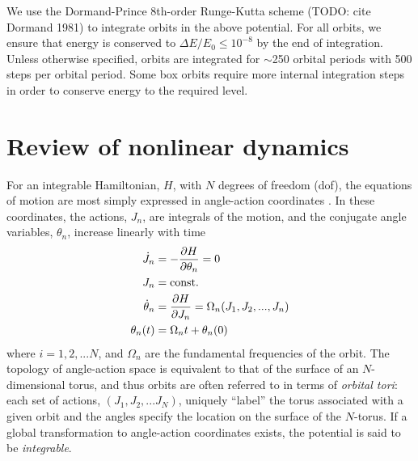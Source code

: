 \documentclass[letterpaper,12pt,preprint]{aastex}
\newcommand{\act}{J}
\begin{document}
We use the Dormand-Prince 8th-order Runge-Kutta scheme (TODO: cite Dormand 1981) to integrate orbits in the above potential. For all orbits, we ensure that energy is conserved to $\Delta E/E_0 \leq 10^{-8}$ by the end of integration. Unless otherwise specified, orbits are integrated for $\sim$250 orbital periods with 500 steps per orbital period. Some box orbits require more internal integration steps in order to conserve energy to the required level. 

\section{Review of nonlinear dynamics}\label{sec:nldreview}

For an integrable Hamiltonian, $H$, with $N$ degrees of freedom (dof), the equations of motion are most simply expressed in angle-action coordinates \cite[e.g.,][]{goldstein80}. In these coordinates, the actions, $J_n$, are integrals of the motion, and the conjugate angle variables, $\theta_n$, increase linearly with time
\begin{align}
	\dot{\act}_n &= -\frac{\partial H}{\partial \theta_n} = 0\\
	\act_n &= {\rm const.}\\
	\dot{\theta}_n &= \frac{\partial H}{\partial \act_n} = \Omega_n(\act_1,\act_2,...,\act_n)\label{eq:aafreq}\\
	\theta_n(t) &= \Omega_n t + \theta_n(0)
\end{align}
where $i=1,2,...N$, and $\Omega_n$ are the fundamental frequencies of the orbit. The topology of angle-action space is equivalent to that of the surface of an $N$-dimensional torus, and thus orbits are often referred to in terms of \emph{orbital tori}: each set of actions, $(\act_1,\act_2,...\act_N)$, uniquely ``label'' the torus associated with a given orbit and the angles specify the location on the surface of the $N$-torus. If a global transformation to angle-action coordinates exists, the potential is said to be \emph{integrable}.
\end{document}
